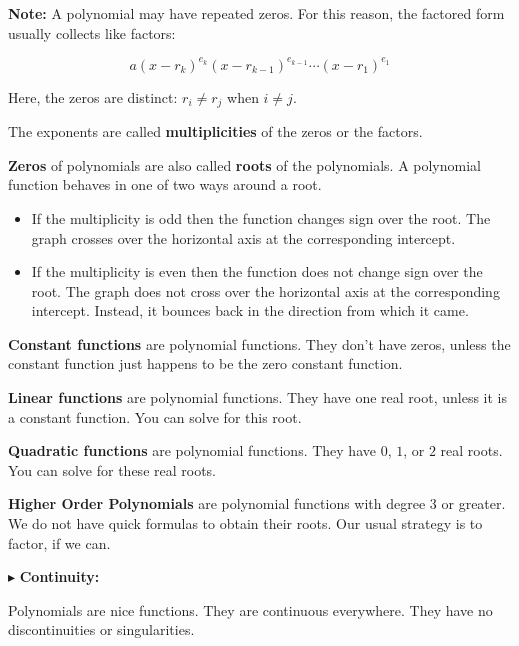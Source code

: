 \documentclass{ximera}
\begin{document}
\textbf{Note:} A polynomial may have repeated zeros.  For this reason, the factored form usually collects like factors:


\[   a (x - r_k)^{e_k} (x - r_{k-1})^{e_{k-1}} \cdots (x - r_1)^{e_1}             \]


Here, the zeros are distinct:  $r_i \ne r_j$ when $i \ne j$.

The exponents are called \textbf{\textcolor{purple!85!blue}{multiplicities}} of the zeros or the factors. 



\textbf{Zeros} of polynomials are also called \textbf{roots} of the polynomials.  A polynomial function behaves in one of two ways around a root.

\begin{itemize}
\item If the multiplicity is odd then the function changes sign over the root.  The graph crosses over the horizontal axis at the corresponding intercept.
\item If the multiplicity is even then the function does not change sign over the root.  The graph does not cross over the horizontal axis at the corresponding intercept. Instead, it bounces back in the direction from which it came.
\end{itemize}


\textbf{Constant functions} are polynomial functions.  They don't have zeros, unless the constant function just happens to be the zero constant function.  


\textbf{Linear functions} are polynomial functions. They have one real root, unless it is a constant function.  You can solve for this root. 


\textbf{Quadratic functions} are polynomial functions. They have $0$, $1$, or $2$ real roots.  You can solve for these real roots. 


\textbf{Higher Order Polynomials} are polynomial functions with degree $3$ or greater.  We do not have quick formulas to obtain their roots.  Our usual strategy is to factor, if we can.  





$\blacktriangleright$ \textbf{\textcolor{red!10!blue!90!}{Continuity:}} 


Polynomials are nice functions.  They are continuous everywhere.  They have no discontinuities or singularities.
\end{document}
